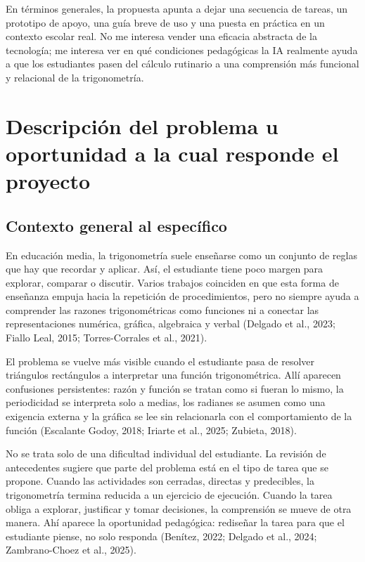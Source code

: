 \documentclass[11pt,spanish,letterpaper,openany]{book}
\begin{document}
En términos generales, la propuesta apunta a dejar una secuencia de tareas, un prototipo de apoyo, una guía breve de uso y una puesta en práctica en un contexto escolar real. No me interesa vender una eficacia abstracta de la tecnología; me interesa ver en qué condiciones pedagógicas la IA realmente ayuda a que los estudiantes pasen del cálculo rutinario a una comprensión más funcional y relacional de la trigonometría.

\section{Descripción del problema u oportunidad a la cual responde el proyecto}

\subsection{Contexto general al específico}

En educación media, la trigonometría suele enseñarse como un conjunto de reglas que hay que recordar y aplicar. Así, el estudiante tiene poco margen para explorar, comparar o discutir. Varios trabajos coinciden en que esta forma de enseñanza empuja hacia la repetición de procedimientos, pero no siempre ayuda a comprender las razones trigonométricas como funciones ni a conectar las representaciones numérica, gráfica, algebraica y verbal (Delgado et al., 2023; Fiallo Leal, 2015; Torres-Corrales et al., 2021).

El problema se vuelve más visible cuando el estudiante pasa de resolver triángulos rectángulos a interpretar una función trigonométrica. Allí aparecen confusiones persistentes: razón y función se tratan como si fueran lo mismo, la periodicidad se interpreta solo a medias, los radianes se asumen como una exigencia externa y la gráfica se lee sin relacionarla con el comportamiento de la función (Escalante Godoy, 2018; Iriarte et al., 2025; Zubieta, 2018).

No se trata solo de una dificultad individual del estudiante. La revisión de antecedentes sugiere que parte del problema está en el tipo de tarea que se propone. Cuando las actividades son cerradas, directas y predecibles, la trigonometría termina reducida a un ejercicio de ejecución. Cuando la tarea obliga a explorar, justificar y tomar decisiones, la comprensión se mueve de otra manera. Ahí aparece la oportunidad pedagógica: rediseñar la tarea para que el estudiante piense, no solo responda (Benítez, 2022; Delgado et al., 2024; Zambrano-Choez et al., 2025).
\end{document}
